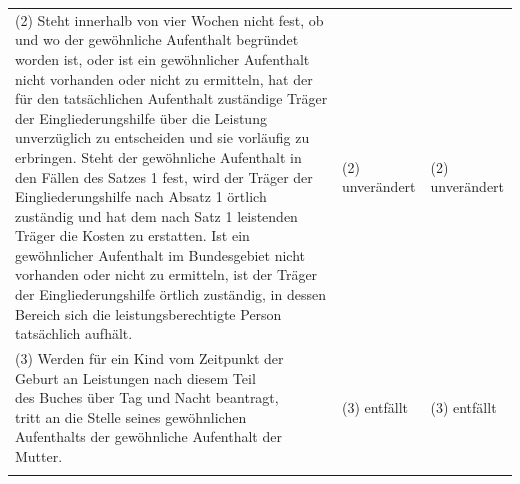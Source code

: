 \documentclass[10pt,a4paper,landscape]{article}
\begin{document}
\begin{longtable}{|L{8.2cm}|L{8.2cm}|L{8.2cm}|}
(2) Steht innerhalb von vier Wochen nicht  \newline fest, ob und wo der gewöhnliche Aufenthalt  \newline begründet worden ist, oder ist ein  \newline gewöhnlicher Aufenthalt nicht vorhanden  \newline oder nicht zu ermitteln, hat der für den  \newline tatsächlichen Aufenthalt zuständige Träger  \newline der Eingliederungshilfe über die Leistung  \newline unverzüglich zu entscheiden und sie  \newline vorläufig zu erbringen. Steht der  \newline gewöhnliche Aufenthalt in den Fällen des  \newline Satzes 1 fest, wird der Träger der  \newline Eingliederungshilfe nach Absatz 1 örtlich  \newline zuständig und hat dem nach Satz 1  \newline leistenden Träger die Kosten zu erstatten.  \newline Ist ein gewöhnlicher Aufenthalt im  \newline Bundesgebiet nicht vorhanden oder nicht  \newline zu ermitteln, ist der Träger der  \newline Eingliederungshilfe örtlich zuständig, in  \newline dessen Bereich sich die  \newline leistungsberechtigte Person tatsächlich  \newline aufhält. & (2) unverändert & (2) unverändert \\
\hhline{|---|}
(3) \textcolor{diffred}{Werden für ein Kind vom Zeitpunkt der  \newline Geburt an Leistungen nach diesem Teil  \newline des Buches über Tag und Nacht beantragt,  \newline tritt an die Stelle seines gewöhnlichen  \newline Aufenthalts der gewöhnliche Aufenthalt der  \newline Mutter.} & (3) entfällt & (3) entfällt \\
\hhline{|---|}

\end{longtable}
\end{document}

